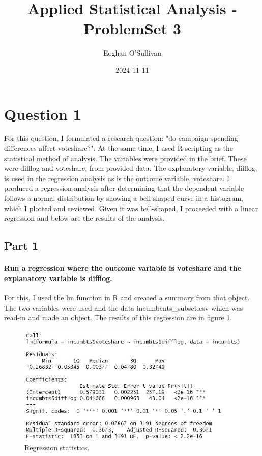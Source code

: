 \documentclass{article}
\title{Applied Statistical Analysis - ProblemSet 3}
\date{2024-11-11}
\author{Eoghan O'Sullivan}
\begin{document}
	\maketitle
	
	\section{Question 1}
	
	For this question, I formulated a research question: "do campaign spending differences affect voteshare?". At the same time, I used R scripting as the statistical method of analysis. The variables were provided in the brief. These were difflog and voteshare, from provided data. The explanatory variable, difflog, is used in the regression analysis as is the outcome variable, voteshare. I produced a regression analysis after determining that the dependent variable follows a normal distribution by showing a bell-shaped curve in a histogram, which I plotted and reviewed. Given it was bell-shaped, I proceeded with a linear regression and below are the results of the analysis.   
	
	\subsection{Part 1}
	\paragraph{Run a regression where the outcome variable is voteshare and the explanatory variable is difflog.}
	For this, I used the lm function in R and created a summary from that object. The two variables were used and the data incumbents\_subset.csv which was read-in and made an object. The results of this regression are in figure 1.
 		\begin{figure}[H]
 			\centering
 				\includegraphics[width=0.9\linewidth]{Question1RegressionAnalysis.jpg}
 				\caption{Regression statistics.}
 				\label{fig:Regression stats}
 		\end{figure}
\end{document}
